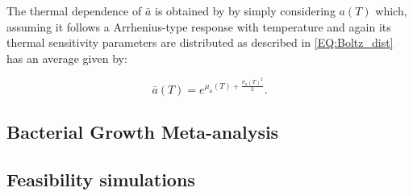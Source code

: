 \documentclass{article}
\begin{document}
The thermal dependence of $\bar{a}$ is obtained by by simply considering $a(T)$ which, assuming it follows a Arrhenius-type response with temperature and again its thermal sensitivity parameters are distributed as described in \cref{EQ:Boltz_dist} has an average given by:

\begin{equation*}
    \bar{a}(T) = e^{\mu_a(T) + \frac{\sigma_a(T)^2}{2}}.
\end{equation*}

\subsection*{Bacterial Growth Meta-analysis}

\subsection*{Feasibility simulations} \label{SI_Sec:Feas_sims}
\end{document}

